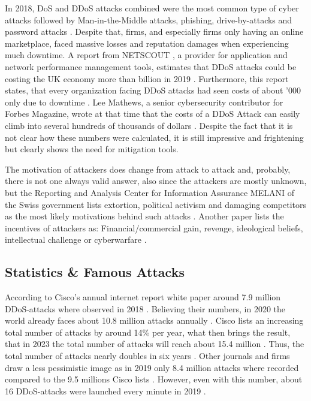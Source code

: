 In 2018, DoS and DDoS attacks combined were the most common type of cyber attacks followed by Man-in-the-Middle attacks, phishing, drive-by-attacks and password attacks \cite{Hostingtribunal-DDoSStatistics, DetectionTechniques}. Despite that, firms, and especially firms only having an online marketplace, faced massive losses and reputation damages when experiencing much downtime. A report from NETSCOUT \cite{Techradar-DDoSStatistics}, a provider for application and network performance management tools, estimates that DDoS attacks could be costing the UK economy more than  billion in 2019 \cite{Techradar-DDoSStatistics}. Furthermore, this report states, that every organization facing DDoS attacks had seen costs of about '000 only due to downtime \cite{Techradar-DDoSStatistics}. Lee Mathews, a senior cybersecurity contributor for Forbes Magazine, wrote at that time that the costs of a DDoS Attack can easily climb into several hundreds of thousands of dollars \cite{Forbes-DDoSCosts}.  Despite the fact that it is not clear how these numbers were calculated, it is still impressive and frightening but clearly shows the need for mitigation tools.

The motivation of attackers does change from attack to attack and, probably, there is not one always valid answer, also since the attackers are mostly unknown, but the Reporting and Analysis Center for Information Assurance MELANI of the Swiss government lists extortion, political activism and damaging competitors as the most likely motivations behind such attacks \cite{DDoS-MELANI}. Another paper lists the incentives of attackers as: Financial/commercial gain, revenge, ideological beliefs, intellectual challenge or cyberwarfare \cite{DDoS-MitigationSurvey}. 


\subsection{Statistics \& Famous Attacks}

According to Cisco's annual internet report white paper around 7.9 million DDoS-attacks where observed in 2018 \cite{Cisco-DDoSStatistics}. Believing their numbers, in 2020 the world already faces about 10.8 million attacks annually \cite{Cisco-DDoSStatistics}. Cisco lists an increasing total number of attacks by around 14\% per year, what then brings the result, that in 2023 the total number of attacks will reach about 15.4 million \cite{Cisco-DDoSStatistics}. Thus, the total number of attacks nearly doubles in six years \cite{Cisco-DDoSStatistics}. Other journals and firms draw a less pessimistic image as in 2019 only 8.4 million attacks where recorded compared to the 9.5 millions Cisco lists \cite{ZDNet-DDoSStatistics}. However, even with this number, about 16 DDoS-attacks were launched every minute in 2019 \cite{ZDNet-DDoSStatistics}. 

